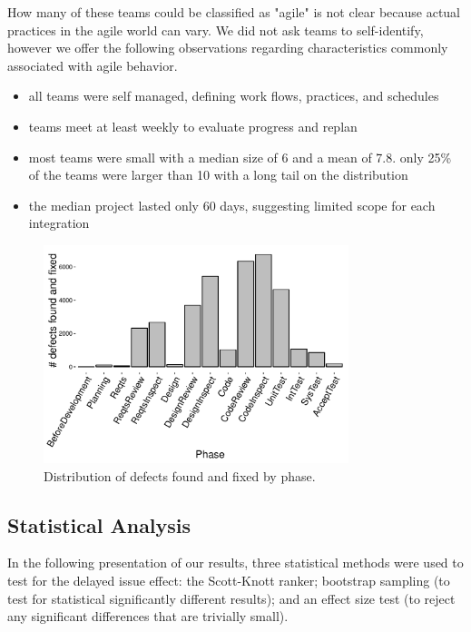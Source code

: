 \documentclass[smallcondensed]{svjour3}
\begin{document}
How many of these teams could be classified as "agile" is not clear because actual practices in the agile world can vary. We did not ask teams to self-identify, however we offer the following observations regarding characteristics commonly associated with agile behavior. 
\begin{itemize}
    \item all teams were self managed, defining work flows, practices, and schedules
    \item teams meet at least weekly to evaluate progress and replan
    \item most teams were small with a median size of 6 and a mean of 7.8. only 25\% of the teams were larger than 10 with a long tail on the distribution
    \item the median project lasted only 60 days, suggesting limited scope for each integration
\end{itemize}
  


\begin{figure}[!t] 
\vspace{0.5cm}
\begin{center}
\includegraphics[height=2.5in]{fix-phase-dist.pdf}
\end{center} 
\caption{Distribution of defects found and fixed by phase.}
\label{fig:fix-phase-dist}
\end{figure}





\subsection{Statistical Analysis}\label{sect:stats}
    
    In the following presentation of our results, three statistical methods were used to test for the delayed
    issue effect: the Scott-Knott ranker;   bootstrap sampling (to test for statistical significantly
    different results); and an effect size test (to reject any significant differences that are trivially small).
    
\end{document}
